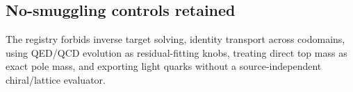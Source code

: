 \subsection{No-smuggling controls retained}
The registry forbids inverse target solving, identity transport across codomains, using QED/QCD evolution as residual-fitting knobs, treating direct top mass as exact pole mass, and exporting light quarks without a source-independent chiral/lattice evaluator.

\begin{center}
\end{center}
